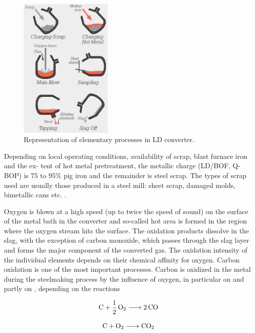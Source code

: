 \begin{figure}[!ht]
	\label{fig:convertor-phases}
	\centering
	\includegraphics[width=0.4\textwidth]{figures/convertor-phases.jpg}
	\caption{Representation of elementary processes in LD converter.}
\end{figure}

Depending on local operating conditions, availability of scrap, blast furnace iron and the ex- tent of hot metal pretreatment, the metallic charge (LD/BOF, Q-BOP) is $75$ to $95\%$ pig iron and the remainder is steel scrap. The types of scrap used are usually those produced in a steel mill: sheet scrap, damaged molds, bimetallic cans etc. \citep{Turkdogan1996}.

Oxygen is blown at a high speed (up to twice the speed of sound) on the surface of the metal bath in the converter and so-called hot area is formed in the region where the oxygen stream hits the surface. The oxidation products dissolve in the slag, with the exception of carbon monoxide, which passes through the slag layer and forms the major component of the converted gas. The oxidation intensity of the individual elements depends on their chemical affinity for oxygen. Carbon oxidation is one of the most important processes. Carbon is oxidized in the metal during the steelmaking process by the influence of oxygen, in particular on  and partly on , depending on the reactions

\begin{equation}
	\ce{ C + 1/2 O2 -> 2CO }
\end{equation}

\begin{equation}
	\ce{ C + O2 -> CO2 }
\end{equation}

